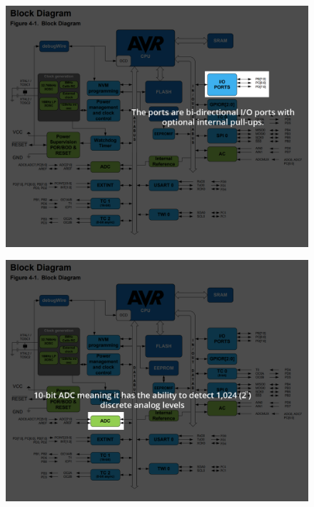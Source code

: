\begin{frame}
	\begin{figure}
		\includegraphics[scale=.2]{assets/ports}  
	\end{figure}
\end{frame}


\begin{frame}
	\begin{figure}
		\includegraphics[scale=.2]{assets/adc}  
	\end{figure}
\end{frame}

